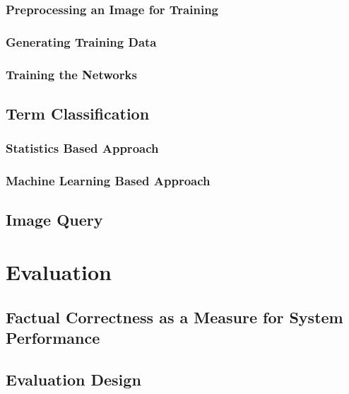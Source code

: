\documentclass[11pt,a4paper,twoside]{article}
\begin{document}
\subsubsection{Preprocessing an Image for Training} \label{SystemTrainPreprocess}
\subsubsection{Generating Training Data} \label{SystemTrainGenerate}
\subsubsection{Training the Networks} \label{SystemTrainTrain}

\subsection{Term Classification} \label{SystemClassification}
\subsubsection{Statistics Based Approach} \label{SystemClassificationStat}
\subsubsection{Machine Learning Based Approach} \label{SystemClassificationML}

\subsection{Image Query} \label{SystemQuery}


\cleardoublepage

\section{Evaluation} \label{Eval}

\subsection{Factual Correctness as a Measure for System Performance} \label{EvalFacts}

\subsection{Evaluation Design} \label{EvalDesign}
\end{document}
